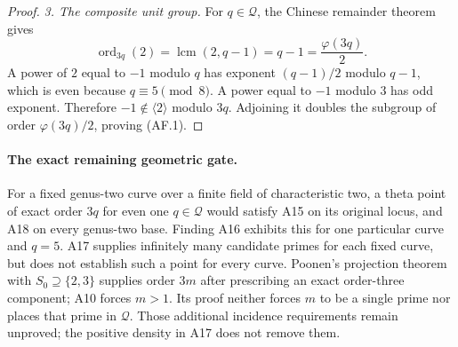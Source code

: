 \begin{proof}
\emph{3. The composite unit group.}
For $q\in\mathcal Q$, the Chinese remainder theorem gives
\[
 \operatorname{ord}_{3q}(2)
       =\operatorname{lcm}(2,q-1)=q-1=\frac{\varphi(3q)}2.
\]
A power of $2$ equal to $-1$ modulo $q$ has exponent
$(q-1)/2$ modulo $q-1$, which is even because $q\equiv5\pmod8$.
A power equal to $-1$ modulo $3$ has odd exponent. Therefore
$-1\notin\langle2\rangle$ modulo $3q$. Adjoining it doubles
the subgroup of order $\varphi(3q)/2$, proving (AF.1).
\end{proof}

\paragraph{The exact remaining geometric gate.}
For a fixed genus-two curve over a finite field of
characteristic two, a theta point of exact order $3q$ for even one
$q\in\mathcal Q$ would satisfy A15 on its original locus, and
A18 on every genus-two base. Finding A16 exhibits this for
one particular curve and $q=5$. A17 supplies infinitely many
candidate primes for each fixed curve, but does not establish
such a point for every curve. Poonen's projection theorem with
$S_0\supseteq\{2,3\}$ supplies order $3m$ after prescribing an
exact order-three component; A10 forces $m>1$. Its proof neither
forces $m$ to be a single prime nor places that prime in
$\mathcal Q$. Those additional incidence requirements remain
unproved; the positive density in A17 does not remove them.
